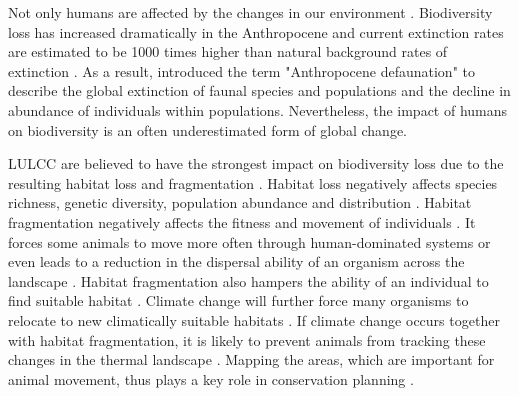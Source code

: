 \documentclass[12pt,a4paper, twoside, english]{article}
\begin{document}
Not only humans are affected by the changes in our environment \citep{Pereira2010}. Biodiversity loss has increased dramatically in the Anthropocene and current extinction rates are estimated to be 1000 times higher than natural background rates of extinction \citep{DeVos2015}. As a result, \cite{Dirzo2014} introduced the term "Anthropocene defaunation" to describe the global extinction of faunal species and populations and the decline in abundance of individuals within populations. Nevertheless, the impact of humans on biodiversity is an often underestimated form of global change. 

LULCC are believed to have the strongest impact on biodiversity loss due to the resulting habitat loss and fragmentation \citep{Fischer2007}. Habitat loss negatively affects species richness, genetic diversity, population abundance and distribution \citep{Fahrig2003}. Habitat fragmentation negatively affects the fitness and movement of individuals \citep{Cattarino2016}. It forces some animals to move more often through human-dominated systems \citep{Nogeire2015} or even leads to a reduction in the dispersal ability of an organism across the landscape \citep{Opdam2004}. Habitat fragmentation also hampers the ability of an individual to find suitable habitat \citep{Cattarino2016}. Climate change will further force many organisms to relocate to new climatically suitable habitats \citep{Hof2011}. If climate change occurs together with habitat fragmentation, it is likely to prevent animals from tracking these changes in the thermal landscape \citep{Opdam2004}. Mapping the areas, which are important for animal movement, thus plays a key role in conservation planning \citep{Nogeire2015}.
\end{document}
